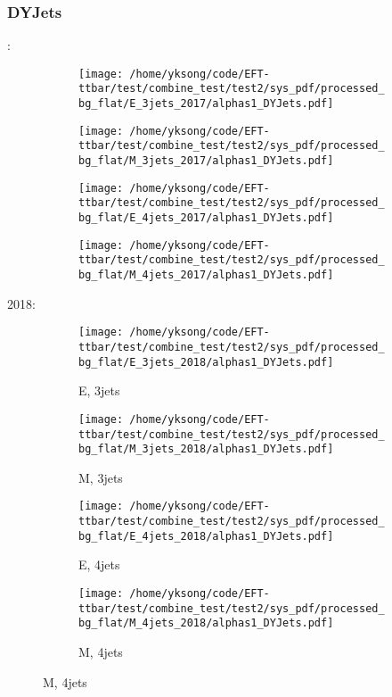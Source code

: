 \documentclass{beamer}
\begin{document}
\begin{frame}
\frametitle{DYJets}
\fontsize{5}{1}:
\begin{figure}
\centering
\begin{subfigure}[b]{0.24\textwidth}
\texttt{[image: /home/yksong/code/EFT-ttbar/test/combine\_test/test2/sys\_pdf/processed\_bg\_flat/E\_3jets\_2017/alphas1\_DYJets.pdf]}
\end{subfigure}
\begin{subfigure}[b]{0.24\textwidth}
\texttt{[image: /home/yksong/code/EFT-ttbar/test/combine\_test/test2/sys\_pdf/processed\_bg\_flat/M\_3jets\_2017/alphas1\_DYJets.pdf]}
\end{subfigure}
\begin{subfigure}[b]{0.24\textwidth}
\texttt{[image: /home/yksong/code/EFT-ttbar/test/combine\_test/test2/sys\_pdf/processed\_bg\_flat/E\_4jets\_2017/alphas1\_DYJets.pdf]}
\end{subfigure}
\begin{subfigure}[b]{0.24\textwidth}
\texttt{[image: /home/yksong/code/EFT-ttbar/test/combine\_test/test2/sys\_pdf/processed\_bg\_flat/M\_4jets\_2017/alphas1\_DYJets.pdf]}
\end{subfigure}
\end{figure}
2018:
\begin{figure}
\centering
\begin{subfigure}[b]{0.24\textwidth}
\texttt{[image: /home/yksong/code/EFT-ttbar/test/combine\_test/test2/sys\_pdf/processed\_bg\_flat/E\_3jets\_2018/alphas1\_DYJets.pdf]}
\captionsetup{font=tiny}
\caption{E, 3jets}
\end{subfigure}
\begin{subfigure}[b]{0.24\textwidth}
\texttt{[image: /home/yksong/code/EFT-ttbar/test/combine\_test/test2/sys\_pdf/processed\_bg\_flat/M\_3jets\_2018/alphas1\_DYJets.pdf]}
\captionsetup{font=tiny}
\caption{M, 3jets}
\end{subfigure}
\begin{subfigure}[b]{0.24\textwidth}
\texttt{[image: /home/yksong/code/EFT-ttbar/test/combine\_test/test2/sys\_pdf/processed\_bg\_flat/E\_4jets\_2018/alphas1\_DYJets.pdf]}
\captionsetup{font=tiny}
\caption{E, 4jets}
\end{subfigure}
\begin{subfigure}[b]{0.24\textwidth}
\texttt{[image: /home/yksong/code/EFT-ttbar/test/combine\_test/test2/sys\_pdf/processed\_bg\_flat/M\_4jets\_2018/alphas1\_DYJets.pdf]}
\captionsetup{font=tiny}
\caption{M, 4jets}
\end{subfigure}
\end{figure}
\end{frame}
\end{document}
